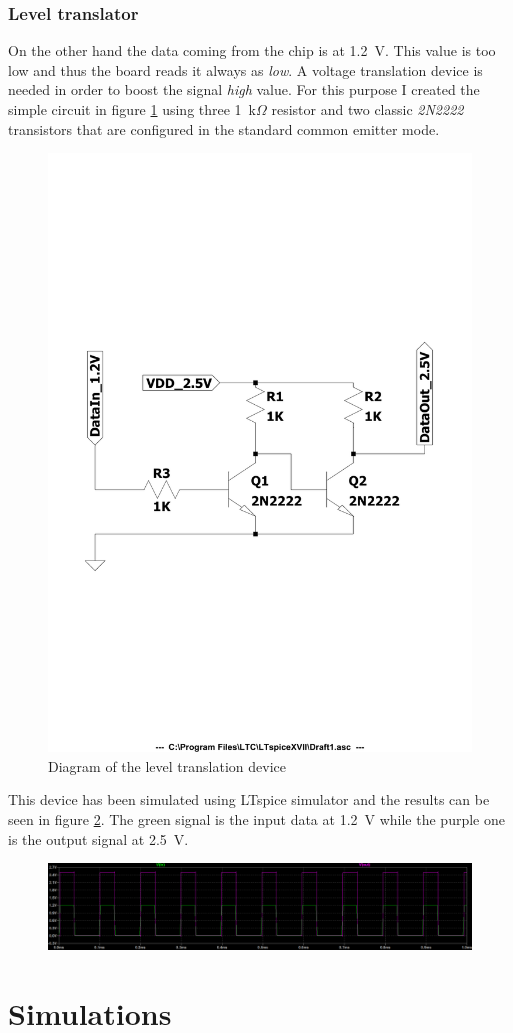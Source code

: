 \subsubsection{Level translator}
On the other hand the data coming from the chip is at 1.2~V. This value is too low and thus the board reads it always as \textit{low}. A voltage translation device is needed in order to boost the signal \textit{high} value. For this purpose I created the simple circuit in figure \ref{fig:diagram} using three 1~k$\Omega$ resistor and two classic \textit{2N2222} transistors that are configured in the standard common emitter mode.
\begin{figure}[H]
	\centering
	\includegraphics[width=0.5\linewidth]{IMG/ch5/DIAGRAM}
	\caption{Diagram of the level translation device}
	\label{fig:diagram}
\end{figure}
\noindent This device has been simulated using LTspice simulator and the results can be seen in figure \ref{fig:transsimulation}. The green signal is the input data at 1.2~V while the purple one is the output signal at 2.5~V.
\begin{figure}[H]
	\centering
	\includegraphics[width=1\linewidth]{IMG/ch5/TRANSSIMULATION}
	\caption{  }
	\label{fig:transsimulation}
\end{figure}

\section{Simulations}

